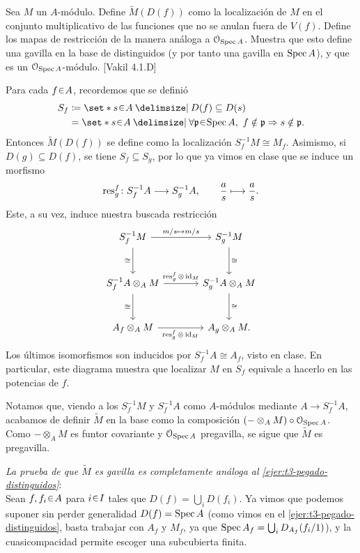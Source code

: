 \begin{ejer}\label{ejer:t3-gavilla-modulo}
Sea $M$ un $A$-módulo. Define $\widetilde M(D(f))$ como la localización de $M$ en el conjunto multiplicativo de las funciones que no se anulan fuera de $V(f)$. Define los mapas de restricción de la manera análoga a $\mathcal O_{\operatorname{Spec} A}$. Muestra que esto define una gavilla en la base de distinguidos (y por tanto una gavilla en $\operatorname{Spec} A$), y que es un $\mathcal O_{\operatorname{Spec} A}$-módulo. \hfill [Vakil 4.1.D]
\end{ejer}
\begin{sol}
Para cada $f\en A$, recordemos que se definió
\[
\begin{aligned}
S_f&\coloneq\set*{s\en A\given D(f)\subseteq D(s)}\\
&=\set*{s\en A\given\forall\mathfrak p\en\Spec A,\ f\notin\mathfrak p\Rightarrow s\notin\mathfrak p}.
\end{aligned}
\]
Entonces $\widetilde M(D(f))$ se define como la localización $S_f^{-1}M\cong M_f$. Asimismo, si $D(g)\subseteq D(f)$, se tiene $S_f\subseteq S_g$, por lo que ya vimos en clase que se induce un morfismo
\[
\operatorname{res}_g^f\colon S_f^{-1}A\longrightarrow S_g^{-1}A,
\qquad\frac{a}{s}\longmapsto\frac{a}{s}.
\]
Este, a su vez, induce nuestra buscada restricción
\[
\begin{tikzcd}[column sep=large,row sep=large]
S_f^{-1}M\arrow[r,"{m/s\mapsto m/s}"]\arrow[d,"\cong"']
&S_g^{-1}M\arrow[d,"\cong"]\\
S_f^{-1}A\otimes_A M\arrow[r,"{\res_g^f\otimes\id_M}"]\arrow[d,"\cong"']
&S_g^{-1}A\otimes_A M\arrow[d,"\cong"]\\
A_f\otimes_A M\arrow[r,"{\res_g^f\otimes\id_M}"']
&A_g\otimes_A M.
\end{tikzcd}
\]
Los últimos isomorfismos son inducidos por $S_f^{-1}A\cong A_f$, visto en clase. En particular, este diagrama muestra que localizar $M$ en $S_f$ equivale a hacerlo en las potencias de $f$.

Notamos que, viendo a los $S_f^{-1}M$ y $S_f^{-1}A$ como $A$-módulos mediante $A\to S_f^{-1}A$, acabamos de definir $\widetilde M$ en la base como la composición $(-\otimes_A M)\circ\mathcal O_{\operatorname{Spec} A}$. Como $-\otimes_A M$ es funtor covariante y $\mathcal O_{\operatorname{Spec} A}$ pregavilla, se sigue que $\widetilde M$ es pregavilla.

\medskip
\noindent\emph{La prueba de que $\widetilde M$ es gavilla es completamente análoga al \cref{ejer:t3-pegado-distinguidos}}:\\
Sean $f,f_i\en A$ para $i\en I$ tales que $D(f)=\bigcup_iD(f_i)$. Ya vimos que podemos suponer sin perder generalidad $D(f)=\operatorname{Spec} A$ (como vimos en el \cref{ejer:t3-pegado-distinguidos}, basta trabajar con $A_f$ y $M_f$, ya que $\operatorname{Spec} A_f=\bigcup_iD_{A_f}(f_i/1)$), y la cuasicompacidad permite escoger una subcubierta finita.


\end{sol}
